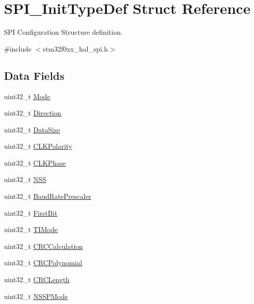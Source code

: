\hypertarget{struct_s_p_i___init_type_def}{}\section{S\+P\+I\+\_\+\+Init\+Type\+Def Struct Reference}
\label{struct_s_p_i___init_type_def}


S\+PI Configuration Structure definition.  




{\ttfamily \#include $<$stm32f0xx\+\_\+hal\+\_\+spi.\+h$>$}

\subsection*{Data Fields}
\begin{DoxyCompactItemize}
\item 
uint32\+\_\+t \hyperlink{struct_s_p_i___init_type_def_a0ffc93ec511ed9cf1663f6939bd3e839}{Mode}
\item 
uint32\+\_\+t \hyperlink{struct_s_p_i___init_type_def_ab94410c1333b512e271b1c135fe50916}{Direction}
\item 
uint32\+\_\+t \hyperlink{struct_s_p_i___init_type_def_a98999b0cd6e4c94f05b61b2554ee0371}{Data\+Size}
\item 
uint32\+\_\+t \hyperlink{struct_s_p_i___init_type_def_a83f278c9d173d3cd021644692bf3c435}{C\+L\+K\+Polarity}
\item 
uint32\+\_\+t \hyperlink{struct_s_p_i___init_type_def_aba7183911cbc41063270dab182de768f}{C\+L\+K\+Phase}
\item 
uint32\+\_\+t \hyperlink{struct_s_p_i___init_type_def_ae4a064e48fd5945eda7210d515fed69c}{N\+SS}
\item 
uint32\+\_\+t \hyperlink{struct_s_p_i___init_type_def_a2fa72ad4f27606fffa2ec9456bcb0a56}{Baud\+Rate\+Prescaler}
\item 
uint32\+\_\+t \hyperlink{struct_s_p_i___init_type_def_a9740c535f073c87bb06668385ce96002}{First\+Bit}
\item 
uint32\+\_\+t \hyperlink{struct_s_p_i___init_type_def_a3db685adbdc6f7bfc7ad0191ba5ab277}{T\+I\+Mode}
\item 
uint32\+\_\+t \hyperlink{struct_s_p_i___init_type_def_a9d334a47c34b01cbfa55ff66cfc1e0ce}{C\+R\+C\+Calculation}
\item 
uint32\+\_\+t \hyperlink{struct_s_p_i___init_type_def_a48aef59cfd7bf0262b1ad993fef2fc7b}{C\+R\+C\+Polynomial}
\item 
uint32\+\_\+t \hyperlink{struct_s_p_i___init_type_def_aba709d1ebebac9b3385fb61d6eeb79a2}{C\+R\+C\+Length}
\item 
uint32\+\_\+t \hyperlink{struct_s_p_i___init_type_def_a537f238782f2847191f7d221ffaa6c9b}{N\+S\+S\+P\+Mode}
\end{DoxyCompactItemize}


